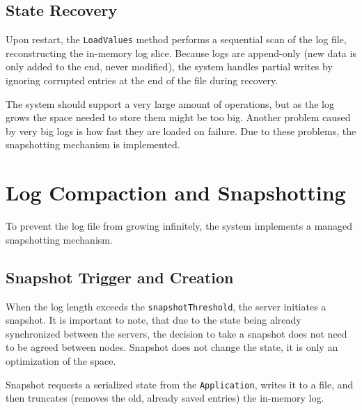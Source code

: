 \documentclass[shortabstract]{iithesis}
\begin{document}
\subsection{State Recovery}
Upon restart, the \texttt{LoadValues} method performs a sequential scan of the log file, reconstructing the in-memory log slice. Because logs are append-only (new data is only added to the end, never modified), the system handles partial writes by ignoring corrupted entries at the end of the file during recovery.

The system should support a very large amount of operations, but as the log grows the space needed to store them might be too big. Another problem caused by very big logs is how fast they are loaded on failure. Due to these problems, the snapshotting mechanism is implemented.

\section{Log Compaction and Snapshotting}
\label{sec:log_compaction}

To prevent the log file from growing infinitely, the system implements a managed snapshotting mechanism.

\subsection{Snapshot Trigger and Creation}
When the log length exceeds the \texttt{snapshotThreshold}, the server initiates a snapshot. It is important to note, that due to the state being already synchronized between the servers, the decision to take a snapshot does not need to be agreed between nodes. Snapshot does not change the state, it is only an optimization of the space.

Snapshot requests a serialized state from the \texttt{Application}, writes it to a file, and then truncates (removes the old, already saved entries) the in-memory log.
\end{document}
